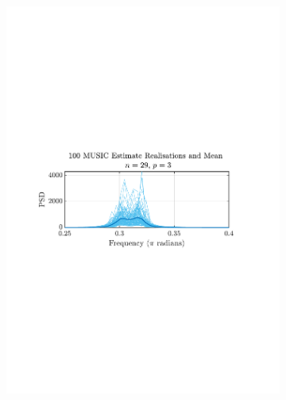 \documentclass[12pt]{article}
\begin{document}
\begin{figure}[H]
\begin{subfigure}{0.49\textwidth}
			\includegraphics[trim={2.2cm 11.2cm 3.15cm  11.2cm}, clip, width=\textwidth]{../MATLAB/figures/q1_3e_fig05.pdf} 
		\end{subfigure}
		\begin{subfigure}{0.49\textwidth}
			\centering

\end{subfigure}
\end{figure}
\end{document}
